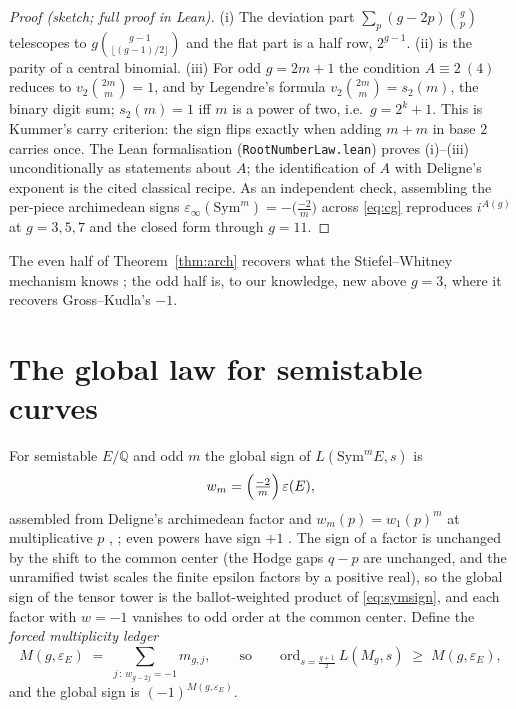 \documentclass[11pt]{article}
\newcommand{\Sym}{\mathrm{Sym}}
\newcommand{\eps}{\varepsilon}
\begin{document}
\begin{proof}[Proof (sketch; full proof in Lean)]
(i) The deviation part $\sum_p (g-2p)\binom gp$ telescopes to
$g\binom{g-1}{\lfloor(g-1)/2\rfloor}$ and the flat part is a half row, $2^{g-1}$.
(ii) is the parity of a central binomial.  (iii) For odd $g=2m+1$ the condition
$A\equiv2\ (4)$ reduces to $v_2\binom{2m}m=1$, and by Legendre's formula
$v_2\binom{2m}m=s_2(m)$, the binary digit sum; $s_2(m)=1$ iff $m$ is a power of
two, i.e.\ $g=2^k+1$.  This is Kummer's carry criterion: the sign flips exactly
when adding $m+m$ in base $2$ carries once.  The Lean formalisation
(\texttt{RootNumberLaw.lean}) proves (i)--(iii) unconditionally as statements about
$A$; the identification of $A$ with Deligne's exponent is the cited classical
recipe.  As an independent check, assembling the per-piece archimedean signs
$\eps_\infty(\Sym^m)=-\bigl(\tfrac{-2}m\bigr)$ \cite[\S5.3]{DeligneAnvers} across
\eqref{eq:cg} reproduces $i^{A(g)}$ at $g=3,5,7$ and the closed form through
$g=11$.
\end{proof}

The even half of Theorem~\ref{thm:arch} recovers what the Stiefel--Whitney mechanism
knows \cite{PR,RohrlichWD}; the odd half is, to our knowledge, new above $g=3$, where
it recovers Gross--Kudla's $-1$.

\section{The global law for semistable curves}

For semistable $E/\mathbb Q$ and odd $m$ the global sign of $L(\Sym^mE,s)$ is
\begin{equation}\label{eq:symsign}
w_m=\Bigl(\tfrac{-2}m\Bigr)\,\eps(E),
\end{equation}
assembled from Deligne's archimedean factor and $w_m(p)=w_1(p)^m$ at multiplicative
$p$ \cite[\S4.3]{MartinWatkins}, \cite{DMW}; even powers have sign $+1$
\cite{Saito}.  The sign of a factor is unchanged by the shift to the common
center (the Hodge gaps $q-p$ are unchanged, and the unramified twist scales the
finite epsilon factors by a positive real), so the global sign of the tensor
tower is the ballot-weighted product of
\eqref{eq:symsign}, and each factor with $w=-1$ vanishes to odd order at the common
center.  Define the \emph{forced multiplicity ledger}
\[
M(g,\eps_E)\;=\;\sum_{j\,:\,w_{g-2j}=-1} m_{g,j},
\qquad\text{so}\qquad
\mathrm{ord}_{s=\frac{g+1}2}\,L(M_g,s)\;\ge\;M(g,\eps_E),
\]
and the global sign is $(-1)^{M(g,\eps_E)}$.
\end{document}
